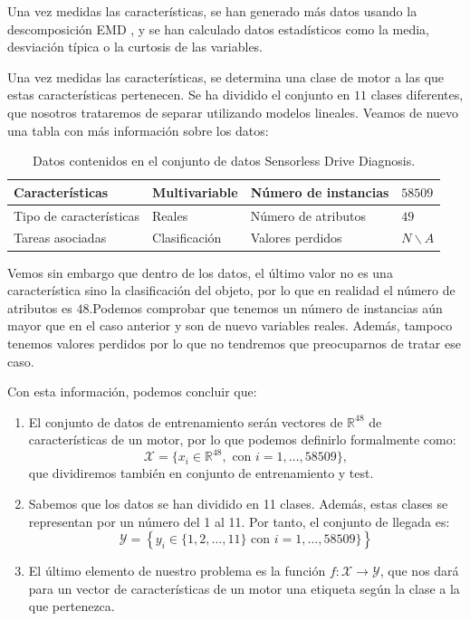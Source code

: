 \documentclass[a4paper, 20pt]{article}
\newcommand{\R}{\mathbb R}
\begin{document}
Una vez medidas las características, se han generado más datos usando la descomposición EMD \cite{noauthor_hilberthuang_2021}, y se han calculado datos estadísticos como la media, desviación típica o la curtosis de las variables.

Una vez medidas las características, se determina una clase de motor a las que estas características pertenecen. Se ha dividido el conjunto en $11$ clases diferentes, que nosotros trataremos de separar utilizando modelos lineales. Veamos de nuevo una tabla con más información sobre los datos:


\begin{table}[h]
  \centering
  \begin{tabular}{|l|l|l|l|}
    \hline
    Características         & Multivariable & Número de instancias & $58509$ \\ \hline
    Tipo de características & Reales        & Número de atributos  & $49$    \\ \hline
    Tareas asociadas        & Clasificación     & Valores perdidos     & $N\backslash A$   \\ \hline
  \end{tabular}
  \caption{Datos contenidos en el conjunto de datos Sensorless Drive Diagnosis.}
\end{table}

Vemos sin embargo que dentro de los datos, el último valor no es una característica sino la clasificación del objeto, por lo que en realidad el número de atributos es $48$.Podemos comprobar que tenemos un número de instancias aún mayor que en el caso anterior y son de nuevo variables reales. Además, tampoco tenemos valores perdidos por lo que no tendremos que preocuparnos de tratar ese caso. 

Con esta información, podemos concluir que:

\begin{enumerate}
\item El conjunto de datos de entrenamiento serán vectores de $\R^{48}$ de características de un motor, por lo que podemos definirlo formalmente como:
$$
\mathcal X = \{ x_i \in \R^{48}, \text{ con } i= 1, \dots, 58509\},
$$
que dividiremos también en conjunto de entrenamiento y test.

\item Sabemos que los datos se han dividido en 11 clases. Además, estas clases se representan por un número del 1 al 11. Por tanto, el conjunto de llegada es:
$$
\mathcal Y = \left\{ y_i \in \{1,2,\dots,11\} \text{ con } i = 1,\dots, 58509\}\right\}
$$
\item El último elemento de nuestro problema es la función $f: \mathcal X \to \mathcal Y$, que nos dará para un vector de características de un motor una etiqueta según la clase a la que pertenezca.
\end{enumerate}
\end{document}
